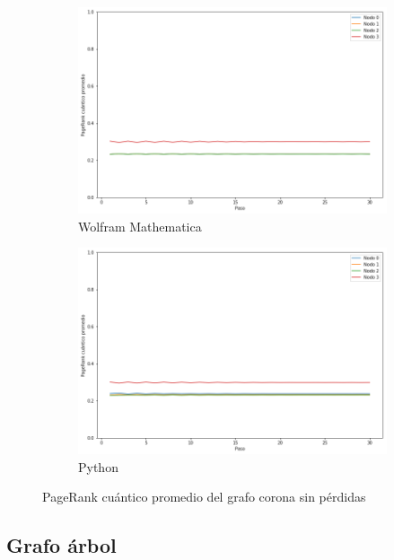 \begin{figure}[H]
    \centering
    \begin{subfigure}[m]{0.45\textwidth}
        \centering
        \includegraphics[width=0.9\linewidth]{img/crown-mean-M.png}
        \caption{Wolfram Mathematica}
    \end{subfigure}
    \begin{subfigure}[m]{0.45\textwidth}
        \centering
        \includegraphics[width=0.9\linewidth]{img/crown-mean-lossless.png}
        \caption{Python}
    \end{subfigure}
    \caption[PageRank cuántico promedio del grafo corona sin pérdidas]{PageRank cuántico promedio del grafo corona sin pérdidas}
    \label{fig:meancrownlossless}
\end{figure}

\subsection{Grafo árbol}

